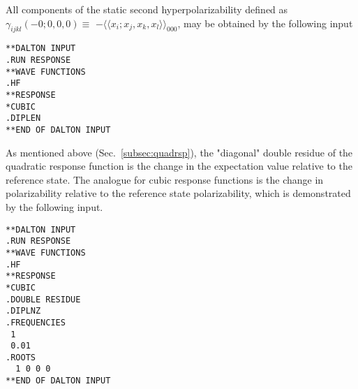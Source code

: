 All components of the static second hyperpolarizability
defined as $\gamma_{ijkl}(-0;0,0,0)\equiv$
$-\langle\!\langle x_i;x_j,x_k,x_l\rangle\!\rangle_{000}$,
 may be obtained by the following input

\begin{verbatim}
**DALTON INPUT
.RUN RESPONSE
**WAVE FUNCTIONS
.HF
**RESPONSE
*CUBIC
.DIPLEN
**END OF DALTON INPUT
\end{verbatim}



As  mentioned above (Sec.~\ref{subsec:quadrsp}), the "diagonal"
double residue of the quadratic
response function is the change in the expectation value relative to the
reference state. The analogue for cubic
response functions is the change in
polarizability relative to the
reference state polarizability, which is demonstrated by the following
input.
\begin{verbatim}
**DALTON INPUT
.RUN RESPONSE
**WAVE FUNCTIONS
.HF
**RESPONSE
*CUBIC
.DOUBLE RESIDUE
.DIPLNZ
.FREQUENCIES
 1
 0.01
.ROOTS
  1 0 0 0
**END OF DALTON INPUT
\end{verbatim}
